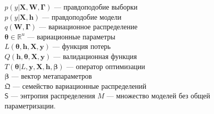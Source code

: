 $p(y|\mathbf{X}, \mathbf{W}, \boldsymbol{\Gamma})$ --- правдоподобие выборки\\
$p(y|\mathbf{X}, \mathbf{h})$ --- правдоподобие модели\\
$q(\mathbf{W}, \boldsymbol{\Gamma})$ --- вариационное распределение\\
$\boldsymbol{\theta} \in \mathbb{R}^u$ --- вариационные параметры\\
$L(\boldsymbol{\theta}, \mathbf{h}, \mathbf{X}, \mathbf{y})$ --- функция потерь\\
$Q(\mathbf{h}, \boldsymbol{\theta},  \mathbf{X}, \mathbf{y})$ --- валидационная функция\\
$T(\boldsymbol{\theta}| L, \mathbf{y}, \mathbf{X},  \mathbf{h}, \boldsymbol{\beta})$ --- оператор оптимизации\\
$\boldsymbol{\beta}$ --- вектор метапараметров\\
$\mathfrak{Q}$ --- семейство вариационные распределений\\
$\mathsf{S}$ --- энтропия распределения
$M$ --- множество моделей без общей параметризации.
